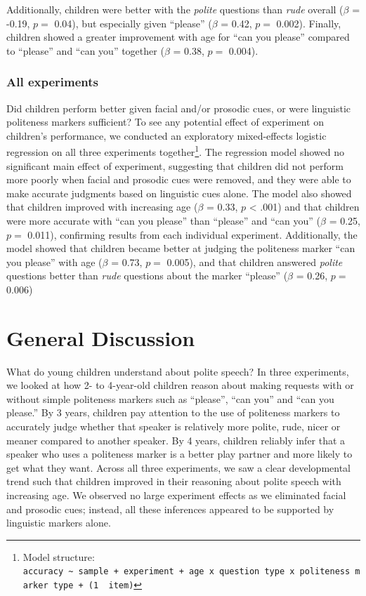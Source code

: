 \documentclass[oneside]{report}
\begin{document}
Additionally, children were better with the \emph{polite} questions than
\emph{rude} overall (\(\beta\) = -0.19, \(p =\) 0.04), but especially
given ``please'' (\(\beta\) = 0.42, \(p =\) 0.002). Finally, children
showed a greater improvement with age for ``can you please'' compared to
``please'' and ``can you'' together (\(\beta\) = 0.38, \(p =\) 0.004).

\subsubsection{All experiments}\label{all-experiments}

Did children perform better given facial and/or prosodic cues, or were
linguistic politeness markers sufficient? To see any potential effect of
experiment on children's performance, we conducted an exploratory
mixed-effects logistic regression on all three experiments
together\footnote{Model structure:
  \texttt{accuracy\ \textasciitilde{}\ sample\ +\ experiment\ +\ age\ x\ question\ type\ x\ politeness\ marker\ type\ +\ (1\ \textbar{}\ item)}}.
The regression model showed no significant main effect of experiment,
suggesting that children did not perform more poorly when facial and
prosodic cues were removed, and they were able to make accurate
judgments based on linguistic cues alone. The model also showed that
children improved with increasing age (\(\beta\) = 0.33, \(p\)
\textless{} .001) and that children were more accurate with ``can you
please'' than ``please'' and ``can you'' (\(\beta\) = 0.25, \(p =\)
0.011), confirming results from each individual experiment.
Additionally, the model showed that children became better at judging
the politeness marker ``can you please'' with age (\(\beta\) = 0.73,
\(p =\) 0.005), and that children answered \emph{polite} questions
better than \emph{rude} questions about the marker ``please'' (\(\beta\)
= 0.26, \(p =\) 0.006)

\section{General Discussion}\label{general-discussion}

What do young children understand about polite speech? In three
experiments, we looked at how 2- to 4-year-old children reason about
making requests with or without simple politeness markers such as
``please'', ``can you'' and ``can you please.'' By 3 years, children pay
attention to the use of politeness markers to accurately judge whether
that speaker is relatively more polite, rude, nicer or meaner compared
to another speaker. By 4 years, children reliably infer that a speaker
who uses a politeness marker is a better play partner and more likely to
get what they want. Across all three experiments, we saw a clear
developmental trend such that children improved in their reasoning about
polite speech with increasing age. We observed no large experiment
effects as we eliminated facial and prosodic cues; instead, all these
inferences appeared to be supported by linguistic markers alone.
\end{document}
